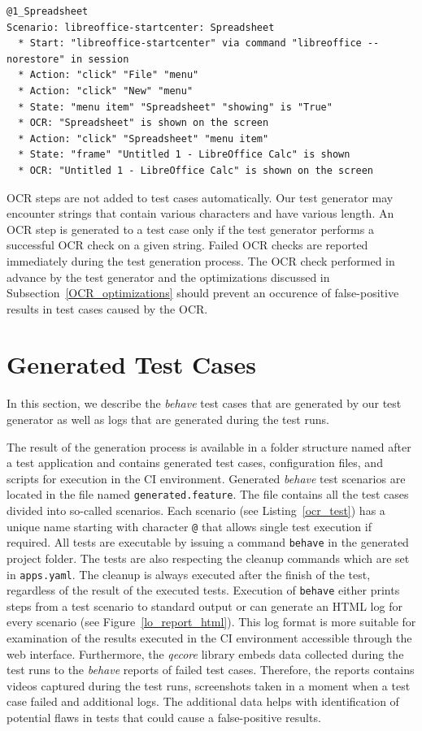 \begin{lstlisting}[language=Gherkin,caption={
A test case demonstrating the integration of OCR into test cases},label={ocr_test}]
@1_Spreadsheet
Scenario: libreoffice-startcenter: Spreadsheet
  * Start: "libreoffice-startcenter" via command "libreoffice --norestore" in session
  * Action: "click" "File" "menu"
  * Action: "click" "New" "menu"
  * State: "menu item" "Spreadsheet" "showing" is "True"
  * OCR: "Spreadsheet" is shown on the screen
  * Action: "click" "Spreadsheet" "menu item"
  * State: "frame" "Untitled 1 - LibreOffice Calc" is shown
  * OCR: "Untitled 1 - LibreOffice Calc" is shown on the screen
\end{lstlisting}

OCR steps are not added to test cases automatically. Our test generator may encounter strings that contain various characters and have various length. An OCR step is generated to a test case only if the test generator performs a successful OCR check on a given string. Failed OCR checks are reported immediately during the test generation process. The OCR check performed in advance by the test generator and the optimizations discussed in Subsection~\ref{OCR_optimizations} should prevent an occurence of false-positive results in test cases caused by the OCR.

\section{Generated Test Cases}
In this section, we describe the \textit{behave} test cases that are generated by our test generator as well as logs that are generated during the test runs. 

The result of the generation process is available in a folder structure named after a test application and contains generated test cases, configuration files, and scripts for execution in the CI environment. 
Generated \textit{behave} test scenarios are located in the file named \texttt{generated.feature}. The file contains all the test cases divided into so-called scenarios. Each scenario (see Listing~\ref{ocr_test}) has a unique name starting with character \texttt{@} that allows single test execution if required. All tests are executable by issuing a command \texttt{behave} in the generated project folder. The tests are also respecting the cleanup commands which are set in \texttt{apps.yaml}. The cleanup is always executed after the finish of the test, regardless of the result of the executed tests. Execution of \texttt{behave} either prints steps from a test scenario to standard output or can generate an HTML log for every scenario (see Figure~\ref{lo_report_html}). This log format is more suitable for examination of the results executed in the CI environment accessible through the web interface. Furthermore, the \textit{qecore} library embeds data collected during the test runs to the \textit{behave} reports of failed test cases. Therefore, the reports contains videos captured during the test runs, screenshots taken in a moment when a test case failed and additional logs. The additional data helps with identification of potential flaws in tests that could cause a false-positive results.

